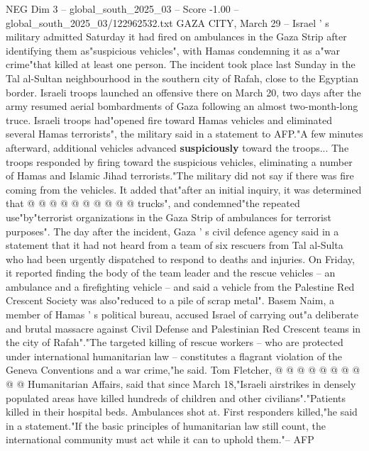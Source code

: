 \begin{textsample}{NEG Dim 3 – global\_south\_2025\_03 – Score -1.00 – global\_south\_2025\_03/122962532.txt}  \label{ex:f3_neg_425}
GAZA CITY, March 29 -- Israel ' s military admitted Saturday it had fired on ambulances in the Gaza Strip after identifying them as"suspicious vehicles", with Hamas condemning it as a"war crime"that killed at least one person.
The incident took place last Sunday in the Tal al-Sultan neighbourhood in the southern city of Rafah, close to the Egyptian border.
Israeli troops launched an offensive there on March 20, two days after the army resumed aerial bombardments of Gaza following an almost two-month-long truce.
Israeli troops had"opened fire toward Hamas vehicles and eliminated several Hamas terrorists", the military said in a statement to AFP."A few minutes afterward, additional vehicles advanced \textbf{suspiciously} toward the troops...
The troops responded by firing toward the suspicious vehicles, eliminating a number of Hamas and Islamic Jihad terrorists."The military did not say if there was fire coming from the vehicles.
It added that"after an initial inquiry, it was determined that @ @ @ @ @ @ @ @ @ @ trucks", and condemned"the repeated use"by"terrorist organizations in the Gaza Strip of ambulances for terrorist purposes".
The day after the incident, Gaza ' s civil defence agency said in a statement that it had not heard from a team of six rescuers from Tal al-Sulta who had been urgently dispatched to respond to deaths and injuries.
On Friday, it reported finding the body of the team leader and the rescue vehicles -- an ambulance and a firefighting vehicle -- and said a vehicle from the Palestine Red Crescent Society was also"reduced to a pile of scrap metal".
Basem Naim, a member of Hamas ' s political bureau, accused Israel of carrying out"a deliberate and brutal massacre against Civil Defense and Palestinian Red Crescent teams in the city of Rafah"."The targeted killing of rescue workers -- who are protected under international humanitarian law -- constitutes a flagrant violation of the Geneva Conventions and a war crime,"he said.
Tom Fletcher, @ @ @ @ @ @ @ @ @ @ Humanitarian Affairs, said that since March 18,"Israeli airstrikes in densely populated areas have killed hundreds of children and other civilians"."Patients killed in their hospital beds.
Ambulances shot at.
First responders killed,"he said in a statement."If the basic principles of humanitarian law still count, the international community must act while it can to uphold them."-- AFP

\end{textsample}

